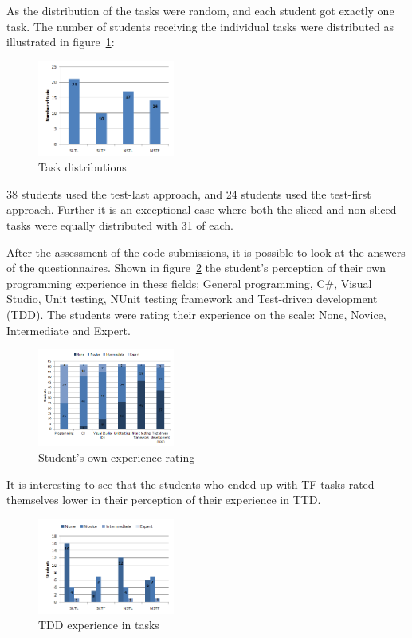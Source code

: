 \documentclass{sig-alternate-05-2015}
\begin{document}
As the distribution of the tasks were random, and each student got exactly one task. The number of students receiving the individual tasks were distributed as illustrated in figure~\ref{fig:Task distributions}:

\begin{figure}[H]
	\centering
	\includegraphics[width=0.4\textwidth]{img02}
	\caption{Task distributions}
	\label{fig:Task distributions}
\end{figure}

38 students used the test-last approach, and 24 students used the test-first approach. Further it is an exceptional case where both the sliced and non-sliced tasks were equally distributed with 31 of each.

After the assessment of the code submissions, it is possible to look at the answers of the questionnaires. Shown in figure~\ref{fig:Student's own experience rating} the student's perception of their own programming experience in these fields; General programming, C{\#}, Visual Studio, Unit testing, NUnit testing framework and Test-driven development (TDD).
The students were rating their experience on the scale: None, Novice, Intermediate and Expert.

\begin{figure}[H]
	\centering
	\includegraphics[width=0.4\textwidth]{img03}
	\caption{Student's own experience rating}
	\label{fig:Student's own experience rating}
\end{figure}

It is interesting to see that the students who ended up with TF tasks rated themselves lower in their perception of their experience in TTD.

\begin{figure}[H]
	\centering
	\includegraphics[width=0.4\textwidth]{img04}
	\caption{TDD experience in tasks}
	\label{fig:TDD experience in tasks}
\end{figure}
\end{document}
